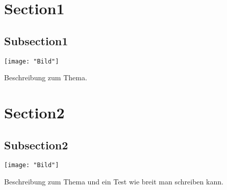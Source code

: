 \section{Section1}
\subsection{Subsection1}
\begin{minipage}[t]{0.3\textwidth}
	\vspace{0pt}								%
	\texttt{[image: "Bild"]}
\end{minipage}\hspace{0.05\textwidth}
\begin{minipage}[t]{0.65\textwidth}
	\vspace{0pt}								%
	Beschreibung zum Thema. \\
\end{minipage}
\vspace{2mm}

\noindent
\begin{minipage}{0.5\textwidth}
\end{minipage}%
\begin{minipage}{0.5\textwidth}
\end{minipage}




\section{Section2}
\subsection{Subsection2}
\begin{minipage}[t]{0.3\textwidth}
	\vspace{0pt}								%
	\texttt{[image: "Bild"]}
\end{minipage}\hspace{0.05\textwidth}
\begin{minipage}[t]{0.3\textwidth}
	\vspace{0pt}								%
	Beschreibung zum Thema und ein Test wie breit
	man schreiben kann. \\
	\begin{center}
		\\
	\end{center}
\end{minipage}\hspace{0.05\textwidth}
\begin{minipage}[t]{0.3\textwidth}
	\vspace{0pt}								%
\end{minipage}



